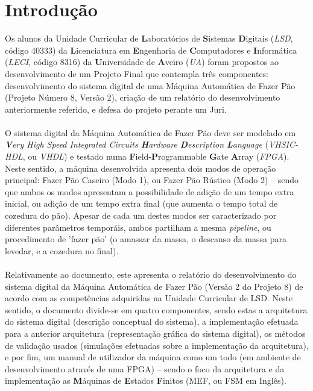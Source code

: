 \documentclass{report}
\begin{document}
\tableofcontents
\listoffigures    %


\clearpage
{}

\chapter{Introdução}
\label{chap.introducao}
Os alunos da Unidade Curricular de \textbf{L}aboratórios de \textbf{S}istemas \textbf{D}igitais (\textit{LSD}, código 40333) da \textbf{L}icenciatura em \textbf{E}ngenharia de \textbf{C}omputadores e \textbf{I}nformática (\textit{LECI}, código 8316) da \textbf{U}niversidade de \textbf{A}veiro (\textit{UA}) foram propostos ao desenvolvimento de um Projeto Final que contempla três componentes: desenvolvimento do sistema digital de uma Máquina Automática de Fazer Pão (Projeto Número 8, Versão 2), criação de um relatório do desenvolvimento anteriormente referido, e defesa do projeto perante um Juri.
\\\\
O sistema digital da Máquina Automática de Fazer Pão deve ser modelado em \textit{\textbf{V}ery High Speed Integrated Circuits \textbf{H}ardware \textbf{D}escription \textbf{L}anguage} (\textit{VHSIC-HDL}, ou \textit{VHDL}) e testado numa \textbf{F}ield-\textbf{P}rogrammable \textbf{G}ate \textbf{A}rray (\textit{FPGA}). Neste sentido, a máquina desenvolvida apresenta dois modos de operação principal: Fazer Pão Caseiro (Modo 1), ou Fazer Pão Rústico (Modo 2) -- sendo que ambos os modos apresentam a possibilidade de adição de um tempo extra inicial, ou adição de um tempo extra final (que aumenta o tempo total de cozedura do pão). Apesar de cada um destes modos ser caracterizado por diferentes parâmetros temporáis, ambos partilham a mesma \textit{pipeline}, ou procedimento de 'fazer pão'  (o amassar da massa, o descanso da massa para levedar, e a cozedura no final).
\\\\
Relativamente ao documento, este apresenta o relatório do desenvolvimento do sistema digital da Máquina Automática de Fazer Pão (Versão 2 do Projeto 8) de acordo com as competências adquiridas na Unidade Curricular de LSD.
Neste sentido, o documento divide-se em quatro componentes, sendo estas a arquitetura do sistema digital (descrição conceptual do sistema), a implementação efetuada para a anterior arquitetura (representação gráfica do sistema digital), os métodos de validação usados (simulações efetuadas sobre a implementação da arquitetura), e por fim, um manual de utilizador da máquina como um todo (em ambiente de desenvolvimento através de uma FPGA) -- sendo o foco da arquitetura e da implementação as \textbf{M}áquinas de \textbf{E}stados \textbf{F}initos (MEF, ou FSM em Inglês).
\end{document}
